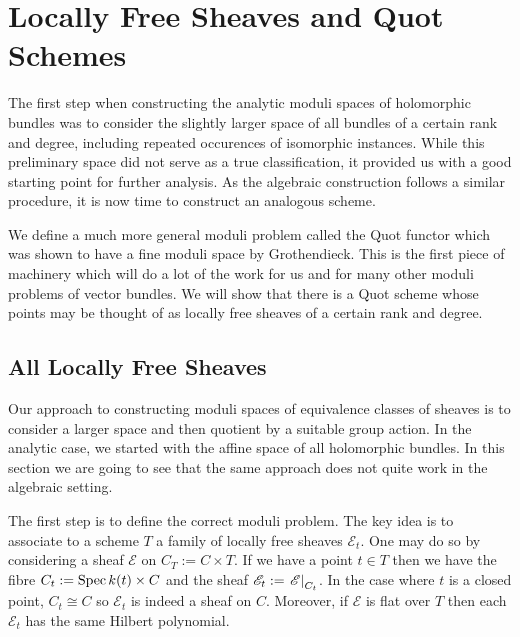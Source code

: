 \documentclass[12pt]{ociamthesis}  %
\begin{document}
\begin{lemma}
\end{lemma}


\missingsection

\section{Locally Free Sheaves and Quot Schemes}

The first step when constructing the analytic moduli spaces of
holomorphic bundles was to consider the slightly larger space of
all bundles of a certain rank and degree, including repeated
occurences of isomorphic instances. While this preliminary space
did not serve as a true
classification,
it provided us with a good starting point for further analysis. As the
algebraic construction follows a similar procedure, it is now
time to construct an analogous scheme.

We define a much more general moduli problem called
the Quot functor which was shown to have a fine moduli space by
Grothendieck. This is the first piece of machinery which will do a
lot of the work for us and for many other moduli problems of vector
bundles. We will show that there is a Quot scheme whose points
may be thought of as locally free sheaves of a certain rank and
degree.

\subsection{All Locally Free Sheaves}

Our approach to constructing moduli spaces of equivalence classes of
sheaves is to consider a larger space and then quotient by a suitable
group action. In the analytic case, we started with the affine space of
all holomorphic bundles. In this section we are going to see that
the same approach does not quite work in the algebraic setting.

The first step is to define the correct moduli problem. The key idea
is to associate to a scheme $T$ a family of locally free sheaves
$\mathscr E_t$. One may do so by considering a sheaf $\mathscr E$ on
$C_T := C\times T$. If we have a point $t\in T$
then we have the fibre $C_t := \operatorname{Spec} k(t) \times C$ and the sheaf
$\mathscr E_t := \left.{\mathscr E}\right\vert_{C_t}$. In the case where
$t$ is a closed point, $C_t \cong C$ so $\mathscr E_t$ is indeed
a sheaf on $C$. Moreover, if $\mathscr E$ is flat over $T$ then
each $\mathscr E_t$ has the same Hilbert polynomial.
\end{document}
